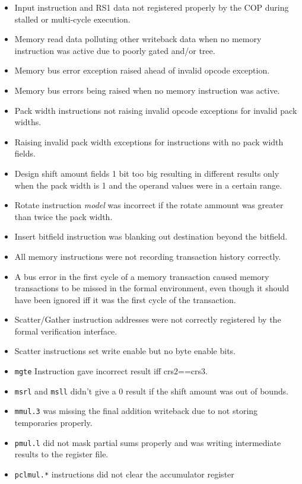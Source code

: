 \begin{itemize}
\item Input instruction and RS1 data not registered properly by the COP during
    stalled or multi-cycle execution.
\item Memory read data polluting other writeback data when no memory
    instruction was active due to poorly gated and/or tree.
\item Memory bus error exception raised ahead of invalid opcode exception.
\item Memory bus errors being raised when no memory instruction was active.
\item Pack width instructions not raising invalid opcode exceptions for
    invalid pack widths.
\item Raising invalid pack width exceptions for instructions with no pack
    width fields.
\item Design shift amount fields 1 bit too big resulting in different results
    only when the pack width is 1 and the operand values were in a certain
    range.
\item Rotate instruction {\em model} was incorrect if the rotate ammount was
    greater than twice the pack width.
\item Insert bitfield instruction was blanking out destination beyond the
    bitfield.
\item All memory instructions were not recording transaction history correctly.
\item A bus error in the first cycle of a memory transaction caused memory
    transactions to be missed in the formal environment, even though it
    should have been ignored iff it was the first cycle of the transaction.
\item Scatter/Gather instruction addresses were not correctly registered
    by the formal verification interface.
\item Scatter instructions set write enable but no byte enable bits.
\item {\tt mgte} Instruction gave incorrect result iff crs2==crs3.
\item {\tt msrl} and {\tt msll} didn't give a 0 result if the shift
    amount was out of bounds.
\item {\tt mmul.3} was missing the final addition writeback due to not
    storing temporaries properly.
\item {\tt pmul.l} did not mask partial sums properly and was writing
    intermediate results to the register file.
\item {\tt pclmul.*} instructions did not clear the accumulator register

\end{itemize}

